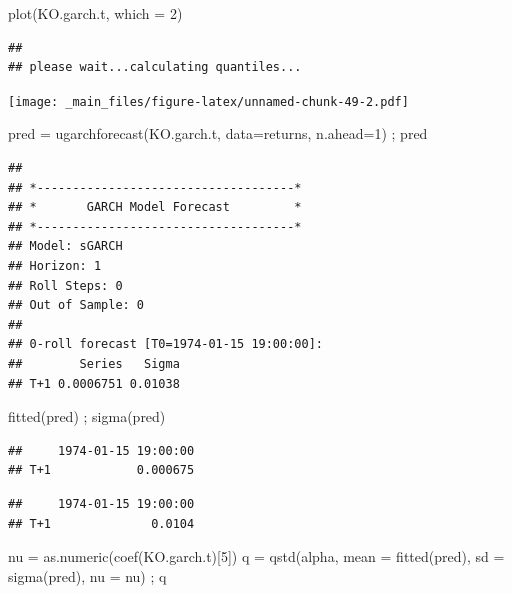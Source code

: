 \documentclass[
  oneside]{book}
\newenvironment{Shaded}{\begin{snugshade}}{\end{snugshade}}
\newcommand{\AttributeTok}[1]{\textcolor[rgb]{0.77,0.63,0.00}{#1}}
\newcommand{\DecValTok}[1]{\textcolor[rgb]{0.00,0.00,0.81}{#1}}
\newcommand{\FunctionTok}[1]{\textcolor[rgb]{0.00,0.00,0.00}{#1}}
\newcommand{\NormalTok}[1]{#1}
\newcommand{\OtherTok}[1]{\textcolor[rgb]{0.56,0.35,0.01}{#1}}
\begin{document}
\begin{Shaded}
\begin{Highlighting}[]
\FunctionTok{plot}\NormalTok{(KO.garch.t, }\AttributeTok{which =} \DecValTok{2}\NormalTok{)}
\end{Highlighting}
\end{Shaded}

\begin{verbatim}
## 
## please wait...calculating quantiles...
\end{verbatim}

\texttt{[image: \_main\_files/figure-latex/unnamed-chunk-49-2.pdf]}

\begin{Shaded}
\begin{Highlighting}[]
\NormalTok{pred }\OtherTok{=} \FunctionTok{ugarchforecast}\NormalTok{(KO.garch.t, }\AttributeTok{data=}\NormalTok{returns, }\AttributeTok{n.ahead=}\DecValTok{1}\NormalTok{) ; pred}
\end{Highlighting}
\end{Shaded}

\begin{verbatim}
## 
## *------------------------------------*
## *       GARCH Model Forecast         *
## *------------------------------------*
## Model: sGARCH
## Horizon: 1
## Roll Steps: 0
## Out of Sample: 0
## 
## 0-roll forecast [T0=1974-01-15 19:00:00]:
##        Series   Sigma
## T+1 0.0006751 0.01038
\end{verbatim}

\begin{Shaded}
\begin{Highlighting}[]
\FunctionTok{fitted}\NormalTok{(pred) ; }\FunctionTok{sigma}\NormalTok{(pred)}
\end{Highlighting}
\end{Shaded}

\begin{verbatim}
##     1974-01-15 19:00:00
## T+1            0.000675
\end{verbatim}

\begin{verbatim}
##     1974-01-15 19:00:00
## T+1              0.0104
\end{verbatim}

\begin{Shaded}
\begin{Highlighting}[]
\NormalTok{nu }\OtherTok{=} \FunctionTok{as.numeric}\NormalTok{(}\FunctionTok{coef}\NormalTok{(KO.garch.t)[}\DecValTok{5}\NormalTok{])}
\NormalTok{q }\OtherTok{=} \FunctionTok{qstd}\NormalTok{(alpha, }\AttributeTok{mean =} \FunctionTok{fitted}\NormalTok{(pred), }\AttributeTok{sd =} \FunctionTok{sigma}\NormalTok{(pred), }\AttributeTok{nu =}\NormalTok{ nu) ; q}
\end{Highlighting}
\end{Shaded}
\end{document}
